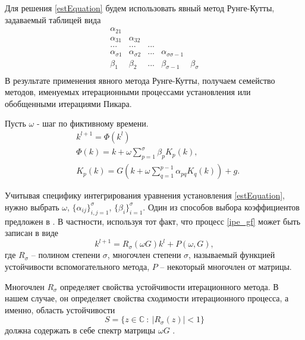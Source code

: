 \documentclass[a4paper,14pt]{extreport}
\begin{document}
Для решения \eqref{estEquation} будем использовать явный метод Рунге-Кутты, задаваемый таблицей вида
	\begin{equation}
	\label{auxilary_method_table}
	\begin{array}{lllll}
	 \alpha_{21}& & & &  \\
	 \alpha_{31}&\alpha_{32} & & &  \\
	 ...& ...& ...& &\\
	 \alpha_{\sigma1}& \alpha_{\sigma2}&... &\alpha_{\sigma\sigma-1}&  \\
	\hline
	 \beta_1&\beta_2 &...&\beta_{\sigma-1}& \beta_\sigma\\
	\end{array}
	\end{equation}
В результате применения явного метода Рунге-Кутты, получаем семейство методов, именуемых итерационными процессами установления или обобщенными итерациями Пикара. 
	
Пусть $\omega$ - шаг по фиктивному времени. 
	\begin{equation}\label{ipe_gf}
	\begin{aligned}
	&k^{l+1}=\Phi(k^{l})\\
	&\Phi(k)=k+\omega \sum_{p=1}^\sigma\beta_pK_p(k),\\
	&K_p(k)=G (k +\omega\sum_{q=1}^{p-1}\alpha_{pq} K_q(k))+g.
	\end{aligned}
	\end{equation}
		
Учитывая специфику интегрирования уравнения установления \eqref{estEquation}, нужно выбрать  $\omega$, $\{\alpha_{ij}\}_{i,j=1}^{\sigma}$, $\{\beta_i\}_{i=1}^{\sigma}$. Один из способов выбора коэффициентов предложен в \cite{Faleichik_Bondar_Kyiv}. В частности, используя тот факт, что процесс \eqref{ipe_gf} может быть записан в виде 
	\begin{equation}
	\label{ipe_spektr}
	k^{l+1} = R_\sigma(\omega G)k^l+P(\omega, G),
	\end{equation}
	где $R_\sigma$ -- полином степени $\sigma$,  многочлен степени $\sigma$, называемый функцией устойчивости вспомогательного метода, $P$ -- некоторый многочлен от матрицы.
	
	Многочлен $R_\sigma$ определяет свойства устойчивости итерационного метода. В нашем случае, он определяет свойства сходимости итерационного процесса, а именно, область устойчивости
	$$ S = \{z \in \mathbb{C}\ :\  |R_{\sigma}(z)|<1  \}$$
должна содержать в себе  спектр матрицы $\omega G$ \cite{Faleichik_Bondar_Kyiv}.
\end{document}
